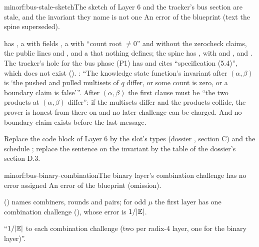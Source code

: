 \begin{finding}{minor}{f:bus-stale-sketch}{The sketch of Layer 6 and the tracker's bus section are stale, and the invariant they name is not one}
 An error of the blueprint (text the spine superseded).

  has , a  with fields
, a  with ``count root $≠ 0$'' and without the zerocheck
claims, the public lines and , and a  that nothing defines; the
spine has ,  with  and , and .
The tracker's hole for the bus phase (P1) has
 and cites
``specification (5.4)'', which does not exist (). : ``The knowledge
state function's invariant after $(α, β)$ is `the pushed and pulled multisets of $q$ differ, or
some count is zero, or a boundary claim is false'{}''. After $(α, β)$ the first clause must be
``the two products at $(α, β)$ differ'': if the multisets differ and the products collide, the
prover is honest from there on and no later challenge can be charged. And no boundary claim
exists before the last message.

 Replace the code block of Layer 6 by the slot's types (dossier
, section C) and the schedule
; replace the
sentence on the invariant by the table of the dossier's section D.3.
\end{finding}

\begin{finding}{minor}{f:bus-binary-combination}{The binary layer's combination challenge has no error assigned}
 An error of the blueprint (omission).

  () names combiners, rounds and pairs; for odd
$μ$ the first layer has one combination challenge (), whose error is $1/|\mathbb{E}|$.

 ``$1/|\mathbb{E}|$ to each combination challenge (two per radix-4 layer, one for
the binary layer)''.
\end{finding}

